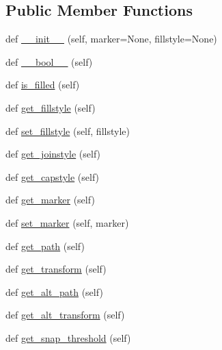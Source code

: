 \subsection*{Public Member Functions}
\begin{DoxyCompactItemize}
\item 
def \hyperlink{classmatplotlib_1_1markers_1_1MarkerStyle_aaea0f158b1732aa8c5fa647e5e580b64}{\+\_\+\+\_\+init\+\_\+\+\_\+} (self, marker=None, fillstyle=None)
\item 
def \hyperlink{classmatplotlib_1_1markers_1_1MarkerStyle_aad8a93f086c2f67539605f5ce5fb1ef1}{\+\_\+\+\_\+bool\+\_\+\+\_\+} (self)
\item 
def \hyperlink{classmatplotlib_1_1markers_1_1MarkerStyle_acb57afd41d865aefef0faa28446cc743}{is\+\_\+filled} (self)
\item 
def \hyperlink{classmatplotlib_1_1markers_1_1MarkerStyle_ac50f0d2dacb14b2a760ec32033c70123}{get\+\_\+fillstyle} (self)
\item 
def \hyperlink{classmatplotlib_1_1markers_1_1MarkerStyle_a8b0b7f24d1d3736cba71a4d20018411f}{set\+\_\+fillstyle} (self, fillstyle)
\item 
def \hyperlink{classmatplotlib_1_1markers_1_1MarkerStyle_a7c1ab78759e175e5d0ed3dad188525c9}{get\+\_\+joinstyle} (self)
\item 
def \hyperlink{classmatplotlib_1_1markers_1_1MarkerStyle_a0362e7c538819a39dc20eae58de60323}{get\+\_\+capstyle} (self)
\item 
def \hyperlink{classmatplotlib_1_1markers_1_1MarkerStyle_ac930003a2428a0b7310235561a44b68f}{get\+\_\+marker} (self)
\item 
def \hyperlink{classmatplotlib_1_1markers_1_1MarkerStyle_ac6129f67c1f7561d7a5302867e4ec161}{set\+\_\+marker} (self, marker)
\item 
def \hyperlink{classmatplotlib_1_1markers_1_1MarkerStyle_a6d8b7c9cda73addef5b1f5fca15add3a}{get\+\_\+path} (self)
\item 
def \hyperlink{classmatplotlib_1_1markers_1_1MarkerStyle_a2327e8f260c020f3679dfdca01facab9}{get\+\_\+transform} (self)
\item 
def \hyperlink{classmatplotlib_1_1markers_1_1MarkerStyle_a4bde29b71b22ca33d619d28124862721}{get\+\_\+alt\+\_\+path} (self)
\item 
def \hyperlink{classmatplotlib_1_1markers_1_1MarkerStyle_a22118eff1397b908c0f909a008e49ced}{get\+\_\+alt\+\_\+transform} (self)
\item 
def \hyperlink{classmatplotlib_1_1markers_1_1MarkerStyle_aedbd6f269273e1bd38eb6d4d3e929bae}{get\+\_\+snap\+\_\+threshold} (self)
\end{DoxyCompactItemize}
